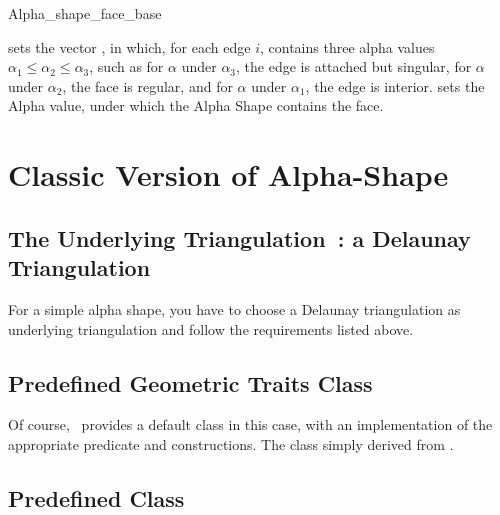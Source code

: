\begin{ccClass}{Alpha_shape_face_base}
\ccModifiers

\begin{ccAdvanced}

{sets the vector , in which, for each edge $i$,  contains three
alpha values
 $\alpha_1 \leq \alpha_2 \leq \alpha_3$, such as for
$\alpha$ under $\alpha_3$, the edge is attached but singular,
for $\alpha$ under $\alpha_2$, the face is regular, and for $\alpha$
under $\alpha_1$, the edge is interior.}
{sets the Alpha value, under which the Alpha Shape contains the
face.}

\end{ccAdvanced}

\end{ccClass}


\section{Classic Version of Alpha-Shape}

\subsection*{The Underlying Triangulation~: a Delaunay Triangulation}

For a simple alpha shape, you have to choose a Delaunay triangulation as
underlying triangulation  and follow the requirements listed above.


\subsection*{Predefined Geometric Traits Class}

Of course,  \cgal\ provides a default  class in this
case, with an implementation of the appropriate predicate and constructions.
The class  simply derived from 
.


\subsection*{Predefined \protect {} Class}


